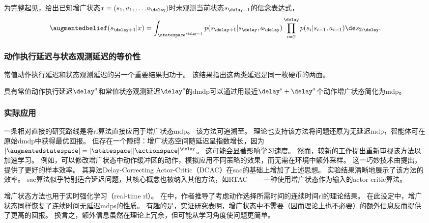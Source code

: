 为完整起见，给出已知增广状态$x=(s_1,a_1,\dots.a_\delay)$时未观测当前状态$s_{\delay+1}$的信念表达式，
\begin{align}
\label{eq:belief_def}
    \augmentedbelief(s_{\delay+1}\vert x)=\int_{\statespace^{\delay-1}}p(s_{\delay+1}\vert s_\delay,a_\delay)\prod_{i=2}^\delay p(s_i|s_{i-1},a_{i-1})\de s_{2:\delay}.
\end{align}

\subsubsection{动作执行延迟与状态观测延迟的等价性}
\label{subsubsec:equiv_action_state_delays}
常值动作执行延迟和状态观测延迟的另一个重要结果归功于\cite{katsikopoulos2003markov}。
该结果指出这两类延迟是同一枚硬币的两面。

\begin{prop}
    具有常值动作执行延迟$\delay^a$和常值状态观测延迟$\delay^s$的\gls{dmdp}可以通过用最近$\delay^s+\delay^a$个动作增广状态简化为\gls{mdp}。
\end{prop}

\subsubsection{实际应用}
一条相对直接的研究路线是将\gls{rl}算法直接应用于增广状态\gls{mdp}。
该方法可追溯至\cite{brooks1972markov}。
理论也支持该方法将问题还原为无延迟\gls{mdp}，智能体可在原始\gls{dmdp}中获得最优回报。
但存在一个障碍：增广状态空间随延迟呈指数增长，因为$\lvert\augmentedstatespace\rvert= \lvert\statespace\rvert\lvert\actionspace\rvert^\delay$\cite{walsh2009learning}。
这可能会显著影响学习速度。
然而，较新的工作提出重新审视该方法以加速学习。
例如，可以修改增广状态中动作缓冲区的动作，模拟应用不同策略的效果，而无需在环境中额外采样。
这一巧妙技术由\cite{bouteiller2020reinforcement}提出，提供了更好的样本效率。
其算法Delay-Correcting Actor-Critic（DCAC）在\gls{sac}\cite{haarnoja2018soft}的基础上增加了上述思想。
实验结果清晰地展示了该方法的效率。
\gls{sac}算法似乎特别适合延迟问题，其核心概念也被纳入其他方法，如RTAC \cite{ramstedt2019real}——一种使用增广状态作为输入的actor-critic算法。

增广状态方法也用于实时强化学习（real-time \gls{rl}）。
在\cite{xiao2020thinking}中，作者推导了考虑动作选择所需时间的连续时间\gls{rl}的理论结果。
在此设定中，增广状态同样恢复了连续时间无延迟\glspl{mdp}的性质。
有趣的是，实证研究表明，增广状态中不需要（因而理论上也不必要）的额外信息反而提供了更高的回报。
换言之，额外信息虽然在理论上冗余，但可能从学习角度使问题更简单。

